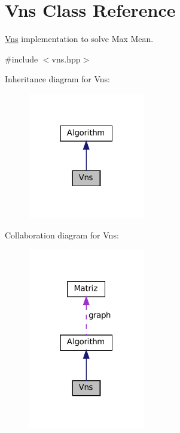 \hypertarget{classVns}{}\section{Vns Class Reference}
\label{classVns}


\hyperlink{classVns}{Vns} implementation to solve Max Mean.  




{\ttfamily \#include $<$vns.\+hpp$>$}



Inheritance diagram for Vns\+:
\nopagebreak
\begin{figure}[H]
\begin{center}
\leavevmode
\includegraphics[width=145pt]{classVns__inherit__graph}
\end{center}
\end{figure}


Collaboration diagram for Vns\+:
\nopagebreak
\begin{figure}[H]
\begin{center}
\leavevmode
\includegraphics[width=145pt]{classVns__coll__graph}
\end{center}
\end{figure}
